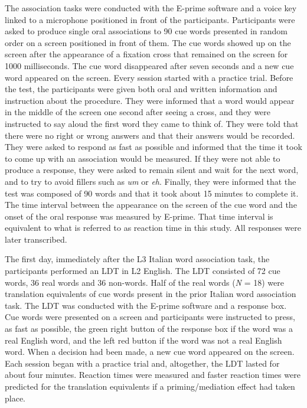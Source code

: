 \documentclass[output=paper,colorlinks,citecolor=brown,nonflat]{langsci/langscibook}
\begin{document}
The association tasks were conducted with the E-prime software and a voice key linked to a microphone positioned in front of the participants. Participants were asked to produce single oral associations to 90 cue words presented in random order on a screen positioned in front of them. The cue words showed up on the screen after the appearance of a fixation cross that remained on the screen for 1000 milliseconds. The cue word disappeared after seven seconds and a new cue word appeared on the screen. Every session started with a practice trial. Before the test, the participants were given both oral and written information and instruction about the procedure. They were informed that a word would appear in the middle of the screen one second after seeing a cross, and they were instructed to say aloud the first word they came to think of. They were told that there were no right or wrong answers and that their answers would be recorded. They were asked to respond as fast as possible and informed that the time it took to come up with an association would be measured. If they were not able to produce a response, they were asked to remain silent and wait for the next word, and to try to avoid fillers such as \textit{um} or \textit{eh}. Finally, they were informed that the test was composed of 90 words and that it took about 15 minutes to complete it. The time interval between the appearance on the screen of the cue word and the onset of the oral response was measured by E-prime. That time interval is equivalent to what is referred to as reaction time in this study. All responses were later transcribed.

The first day, immediately after the L3 Italian word association task, the participants performed an LDT in L2 English. The LDT consisted of 72 cue words, 36 real words and 36 non-words. Half of the real words (\textit{N} = 18) were translation equivalents of cue words present in the prior Italian word association task. The LDT was conducted with the E-prime software and a response box. Cue words were presented on a screen and participants were instructed to press, as fast as possible, the green right button of the response box if the word was a real English word, and the left red button if the word was not a real English word. When a decision had been made, a new cue word appeared on the screen. Each session began with a practice trial and, altogether, the LDT lasted for about four minutes. Reaction times were measured and faster reaction times were predicted for the translation equivalents if a priming/mediation effect had taken place.
\end{document}

